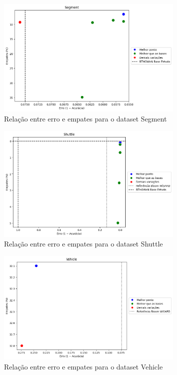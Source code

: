 \documentclass{article}
\begin{document}
\begin{figure}[H]
\centering
\includegraphics[width=0.8\textwidth]{figures/image2.png}
\caption{Relação entre erro e empates para o dataset Segment}
\label{fig:segment}
\end{figure}

\begin{figure}[H]
\centering
\includegraphics[width=0.8\textwidth]{figures/image9.png}
\caption{Relação entre erro e empates para o dataset Shuttle}
\label{fig:shuttle}
\end{figure}

\begin{figure}[H]
\centering
\includegraphics[width=0.8\textwidth]{figures/image7.png}
\caption{Relação entre erro e empates para o dataset Vehicle}
\label{fig:vehicle}
\end{figure}
\end{document}
